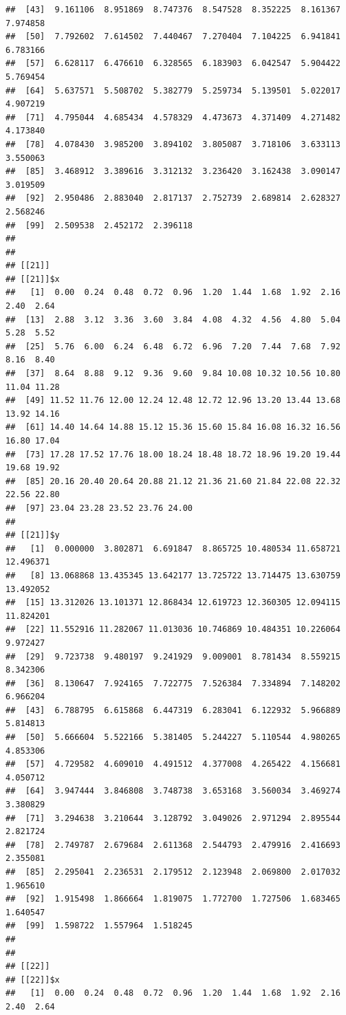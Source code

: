 \documentclass[
  ignorenonframetext,
]{beamer}
\begin{document}
\begin{frame}[fragile]{}
\begin{verbatim}
##  [43]  9.161106  8.951869  8.747376  8.547528  8.352225  8.161367  7.974858
##  [50]  7.792602  7.614502  7.440467  7.270404  7.104225  6.941841  6.783166
##  [57]  6.628117  6.476610  6.328565  6.183903  6.042547  5.904422  5.769454
##  [64]  5.637571  5.508702  5.382779  5.259734  5.139501  5.022017  4.907219
##  [71]  4.795044  4.685434  4.578329  4.473673  4.371409  4.271482  4.173840
##  [78]  4.078430  3.985200  3.894102  3.805087  3.718106  3.633113  3.550063
##  [85]  3.468912  3.389616  3.312132  3.236420  3.162438  3.090147  3.019509
##  [92]  2.950486  2.883040  2.817137  2.752739  2.689814  2.628327  2.568246
##  [99]  2.509538  2.452172  2.396118
## 
## 
## [[21]]
## [[21]]$x
##   [1]  0.00  0.24  0.48  0.72  0.96  1.20  1.44  1.68  1.92  2.16  2.40  2.64
##  [13]  2.88  3.12  3.36  3.60  3.84  4.08  4.32  4.56  4.80  5.04  5.28  5.52
##  [25]  5.76  6.00  6.24  6.48  6.72  6.96  7.20  7.44  7.68  7.92  8.16  8.40
##  [37]  8.64  8.88  9.12  9.36  9.60  9.84 10.08 10.32 10.56 10.80 11.04 11.28
##  [49] 11.52 11.76 12.00 12.24 12.48 12.72 12.96 13.20 13.44 13.68 13.92 14.16
##  [61] 14.40 14.64 14.88 15.12 15.36 15.60 15.84 16.08 16.32 16.56 16.80 17.04
##  [73] 17.28 17.52 17.76 18.00 18.24 18.48 18.72 18.96 19.20 19.44 19.68 19.92
##  [85] 20.16 20.40 20.64 20.88 21.12 21.36 21.60 21.84 22.08 22.32 22.56 22.80
##  [97] 23.04 23.28 23.52 23.76 24.00
## 
## [[21]]$y
##   [1]  0.000000  3.802871  6.691847  8.865725 10.480534 11.658721 12.496371
##   [8] 13.068868 13.435345 13.642177 13.725722 13.714475 13.630759 13.492052
##  [15] 13.312026 13.101371 12.868434 12.619723 12.360305 12.094115 11.824201
##  [22] 11.552916 11.282067 11.013036 10.746869 10.484351 10.226064  9.972427
##  [29]  9.723738  9.480197  9.241929  9.009001  8.781434  8.559215  8.342306
##  [36]  8.130647  7.924165  7.722775  7.526384  7.334894  7.148202  6.966204
##  [43]  6.788795  6.615868  6.447319  6.283041  6.122932  5.966889  5.814813
##  [50]  5.666604  5.522166  5.381405  5.244227  5.110544  4.980265  4.853306
##  [57]  4.729582  4.609010  4.491512  4.377008  4.265422  4.156681  4.050712
##  [64]  3.947444  3.846808  3.748738  3.653168  3.560034  3.469274  3.380829
##  [71]  3.294638  3.210644  3.128792  3.049026  2.971294  2.895544  2.821724
##  [78]  2.749787  2.679684  2.611368  2.544793  2.479916  2.416693  2.355081
##  [85]  2.295041  2.236531  2.179512  2.123948  2.069800  2.017032  1.965610
##  [92]  1.915498  1.866664  1.819075  1.772700  1.727506  1.683465  1.640547
##  [99]  1.598722  1.557964  1.518245
## 
## 
## [[22]]
## [[22]]$x
##   [1]  0.00  0.24  0.48  0.72  0.96  1.20  1.44  1.68  1.92  2.16  2.40  2.64

\end{verbatim}
\end{frame}
\end{document}
